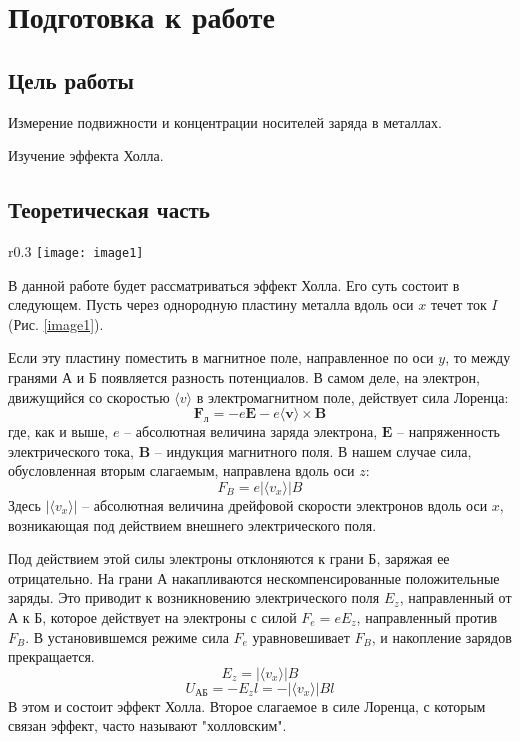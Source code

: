 \documentclass{lab}
\newcommand{\ve}[1]{\boldsymbol{#1}}
\begin{document}


\section*{Подготовка к работе}

\subsection*{Цель работы}

Измерение подвижности и концентрации носителей заряда в металлах.

Изучение эффекта Холла.

\subsection*{Теоретическая часть}

\begin{wrapfigure}{r}{0.3\textwidth}
	\vspace{-1cm}
	\centering
	\texttt{[image: image1]}
	\vspace{-0.7cm}
	\caption{\footnotesize Образец с током в магнитном поле}
	\label{image1}
\end{wrapfigure}

В данной работе будет рассматриваться эффект Холла. Его суть состоит в следующем. Пусть через однородную пластину металла вдоль оси $ x $ течет ток $ I $ (Рис. \ref{image1}).

Если эту пластину поместить в магнитное поле, направленное по оси $ y $, то между гранями А и Б появляется разность потенциалов. В самом деле, на электрон, движущийся со скоростью $ \langle v \rangle $ в электромагнитном поле, действует сила Лоренца:
\begin{equation}
\ve{F}_л = -e {\ve{E}} - e\langle{\ve{v}}\rangle \times {\ve{B}}
\end{equation}
где, как и выше, $ e $ -- абсолютная величина заряда электрона, $ \ve{E} $ -- напряженность электрического тока, $ \ve{B} $ -- индукция магнитного поля. В нашем случае сила, обусловленная вторым слагаемым, направлена вдоль оси $ z $:
\begin{equation}
F_B = e | \langle v_x \rangle | B
\end{equation}
Здесь $ | \langle v_x \rangle | $ -- абсолютная величина дрейфовой скорости электронов вдоль оси $ x $, возникающая под действием внешнего электрического поля.

Под действием этой силы электроны отклоняются к грани Б, заряжая ее отрицательно.
На грани А накапливаются нескомпенсированные положительные заряды.
Это приводит к возникновению электрического поля $ E_z $, направленный от А к Б,
которое действует на электроны с силой $ F_e = eE_z $, направленный против $ F_B $.
В установившемся режиме сила $ F_e $ уравновешивает $ F_B $, и накопление зарядов прекращается.
$$ E_z = | \langle v_x \rangle | B $$
$$ U_{АБ} = -E_zl = -| \langle v_x \rangle |Bl $$
В этом и состоит эффект Холла. Второе слагаемое в силе Лоренца, с которым связан эффект, часто называют "холловским".
\end{document}
